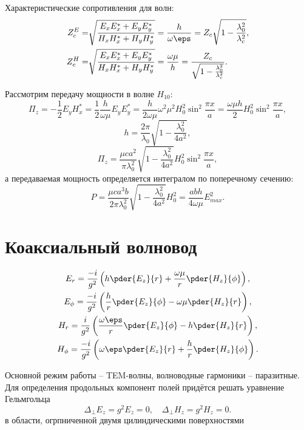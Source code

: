 Характеристические сопротивления для волн:
\begin{align*}
	Z_c^E = & \sqrt{\frac{E_xE_x^* + E_yE_y^*}{H_xH_x^* + H_yH_y^*}} = \frac{h}{\omega\eps} = Z_c\sqrt{1 - \frac{\lambda_0^2}{\lambda_c^2}},\\
	Z_c^H = & \sqrt{\frac{E_xE_x^* + E_yE_y^*}{H_xH_x^* + H_yH_y^*}} = \frac{\omega\mu}{h} = \frac{Z_c}{\sqrt{1 - \frac{\lambda_0^2}{\lambda_c^2}}}.
\end{align*}

Рассмотрим передачу мощности в волне \( H_{10} \):
\[
	\Pi_z = -\frac{1}{2}E_y H_x^* = \frac{1}{2}\frac{h}{\omega\mu}E_yE_y^* = \frac{h}{2\omega\mu}\omega^2\mu^2 H_0^2\sin^2\frac{\pi x}{a} = \frac{\omega\mu h}{2}H_0^2\sin^2\frac{\pi x}{a},
\]
\[
	h= \frac{2\pi}{\lambda_0}\sqrt{1 - \frac{\lambda_0^2}{4a^2}},
\]
\[
	\Pi_z = \frac{\mu ca^2}{\pi\lambda_0^2}\sqrt{1 - \frac{\lambda_0^2}{4a^2}}H_0^2\sin^2\frac{\pi x}{a},
\]
а передаваемая мощность определяется интегралом по поперечному сечению:
\[
	P = \frac{\mu ca^3b}{2\pi\lambda_0^2}\sqrt{1 - \frac{\lambda_0^2}{4a^2}}H_0^2 = \frac{abh}{4\omega\mu}E_{max}^2.
\]

\section{Коаксиальный волновод}
\begin{gather*}
	E_r =    \frac{-i}{g^2}\left(h\pder{E_z}{r} + \frac{\omega\mu}{r}\pder{H_z}{\phi}\right),\\
	E_\phi = \frac{-i}{g^2}\left(\frac{h}{r}\pder{E_z}{\phi} - \omega\mu\pder{H_z}{r}\right),\\
	H_r =    \frac{i}{g^2}\left(\frac{\omega\eps}{r}\pder{E_z}{\phi} - h\pder{H_z}{r}\right),\\
	H_\phi = \frac{-i}{g^2}\left(\omega\eps\pder{E_z}{r} + \frac{h}{r}\pder{H_z}{\phi}\right).
\end{gather*}

Основной режим работы -- TEM-волны, волноводные гармоники -- паразитные.
Для определения продольных компонент полей придётся решать уравнение Гельмгольца
\[
	\Delta_\perp E_z = g^2 E_z = 0,\quad \Delta_\perp H_z = g^2 H_z = 0.
\]
в области, огрпниченной двумя цилиндическими поверхностями
\begin{center}
\end{center}

